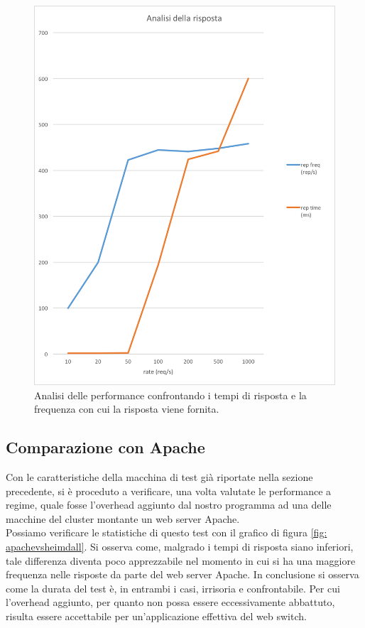 \documentclass[italian]{tktltiki2}
\begin{document}
\begin{figure}[H]
\centering
\includegraphics[width=\textwidth]{images/repvsfreq}
\caption{Analisi delle performance confrontando i tempi di risposta e la frequenza con cui la risposta viene fornita.\label{fig: repvsfreq}}
\end{figure}\subsection{Comparazione con Apache}
Con le caratteristiche della macchina di test già riportate nella sezione precedente, si è proceduto a verificare, una volta valutate le performance a regime, quale fosse l'overhead aggiunto dal nostro programma ad una delle macchine del cluster montante un web server Apache. \\
Possiamo verificare le statistiche di questo test con il grafico di figura \ref{fig: apachevsheimdall}. Si osserva come, malgrado i tempi di risposta siano inferiori, tale differenza diventa poco apprezzabile nel momento in cui si ha una maggiore frequenza nelle risposte da parte del web server Apache. In conclusione si osserva come la durata del test è, in entrambi i casi, irrisoria e confrontabile. Per cui l'overhead aggiunto, per quanto non possa essere eccessivamente abbattuto, risulta essere accettabile per un'applicazione effettiva del web switch.
\end{document}
